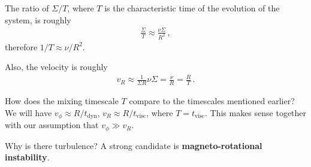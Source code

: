 \documentclass[main.tex]{subfiles}
\begin{document}
The ratio of \(\Sigma / T\), where \(T\) is the characteristic time of the evolution of the system, is roughly 
%
\begin{align}
\frac{\Sigma}{T} \approx \frac{\nu \Sigma }{R^2}
\,,
\end{align}
%
therefore \( 1/ T \approx \nu / R^2\).

Also, the velocity is roughly 
%
\begin{align}
v_R \approx \frac{1}{\Sigma R} \nu \Sigma = \frac{\nu}{R} = \frac{R}{T}
\,.
\end{align}

How does the mixing timescale \(T\) compare to the timescales mentioned earlier? 
We will have \(v_\phi \approx R / t _{\text{dyn}}\), \(v_R \approx R / t _{\text{visc}}\), where \(T = t _{\text{visc}}\). 
This makes sense together with our assumption that \(v_\phi \gg v_R\). 

Why is there turbulence? A strong candidate is \textbf{magneto-rotational instability}. 
\end{document}
